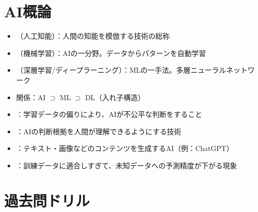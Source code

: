 \section{AI概論}

\begin{teigi}[AI / ML / DLの関係]
\begin{itemize}
  \item {}（人工知能）：人間の知能を模倣する技術の総称
  \item {}（機械学習）：AIの一分野。データからパターンを自動学習
  \item {}（深層学習/ディープラーニング）：MLの一手法。多層ニューラルネットワーク
  \item 関係：AI $\supset$ ML $\supset$ DL（入れ子構造）
\end{itemize}
\end{teigi}

\begin{hikaku}[機械学習の3分類]
\end{hikaku}

\begin{teigi}[AI関連の重要用語]
\begin{itemize}
  \item {}：学習データの偏りにより、AIが不公平な判断をすること
  \item {}：AIの判断根拠を人間が理解できるようにする技術
  \item {}：テキスト・画像などのコンテンツを生成するAI（例：ChatGPT）
  \item {}：訓練データに適合しすぎて、未知データへの予測精度が下がる現象
\end{itemize}
\end{teigi}

\section{過去問ドリル}

